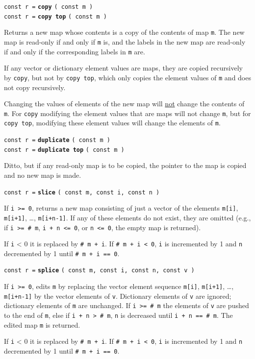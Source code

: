 \documentclass[12pt]{article}
\newcommand{\ttkey}[1]{{\tt \bfseries #1}}
\newenvironment{indpar}[1][0.3in]%
	{\begin{list}{}%
		     {\setlength{\itemsep}{0in}%
		      \setlength{\topsep}{0in}%
		      \setlength{\parsep}{1ex}%
		      \setlength{\labelwidth}{#1}%
		      \setlength{\leftmargin}{#1}%
		      \addtolength{\leftmargin}{\labelsep}}%
	 \item}%
	{\end{list}}
\begin{document}
{\tt const r =} \ttkey{copy} {\tt ( const m )} \\
{\tt const r =} \ttkey{copy top} {\tt ( const m )} %
\label{MAP-COPY}
\begin{indpar}
Returns a new map whose contents is a copy of the contents of
map {\tt m}.  The new map is read-only if and only if {\tt m} is,
and the labels in the new map are read-only if and only if the
corresponding labels in {\tt m} are.

If any vector or dictionary element values are maps, they are
copied recursively by {\tt copy}, but not by
{\tt copy top}, which only copies the element values of {\tt m}
and does not copy recursively.

Changing the values of elements of the new map will \underline{not} change
the contents of {\tt m}.  For {\tt copy} modifying the element values
that are maps will not change {\tt m}, but for {\tt copy top},
modifying these element values will change the elements of {\tt m}.

\end{indpar}

{\tt const r =} \ttkey{duplicate} {\tt ( const m )} \\
{\tt const r =} \ttkey{duplicate top} {\tt ( const m )}
\begin{indpar}
Ditto, but if any read-only map is to be copied, the pointer
to the map is copied and no new map is made.
\end{indpar}

{\tt const r =} \ttkey{slice} {\tt ( const m, const i, const n )}
\begin{indpar}
If {\tt i >= 0}, returns a new map consisting of just a vector of the
elements {\tt m[i]}, {\tt m[i+1]}, \ldots, {\tt m[i+n-1]}.  
If any of these elements do not exist, they are omitted (e.g.,
if {\tt i >= \# m}, {\tt i + n <= 0}, or {\tt n <= 0},
the empty map is returned).

If {\tt i} < 0 it is replaced by {\tt \# m + i}.  If {\tt \# m + i < 0},
{\tt i} is incremented by 1 and {\tt n} decremented by 1 until 
{\tt \# m + i == 0}.
\end{indpar}

{\tt const r =} \ttkey{splice} {\tt ( const m, const i, const n, const v )}
\begin{indpar}
If {\tt i >= 0}, edits {\tt m} by replacing the vector element sequence
{\tt m[i]}, {\tt m[i+1]}, \ldots, {\tt m[i+n-1]} by the
vector elements of {\tt v}.  Dictionary elements of {\tt v} are ignored;
dictionary elements of {\tt m} are unchanged.
If {\tt i >= \# m} the elements of {\tt v} are pushed to the end of {\tt m},
else if {\tt i + n > \# m}, {\tt n} is decreased until {\tt i + n == \# m}.
The edited map {\tt m} is returned.

If {\tt i} < 0 it is replaced by {\tt \# m + i}.  If {\tt \# m + i < 0},
{\tt i} is incremented by 1 and {\tt n} decremented by 1 until 
{\tt \# m + i == 0}.
\end{indpar}
\end{document}
